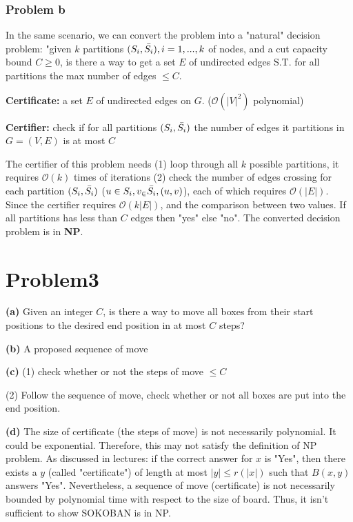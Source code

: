 \documentclass[openany]{article}
\begin{document}
\subsubsection*{Problem b}
In the same scenario, we can convert the problem into a "natural" decision problem: "given $k$ partitions $(S_i, \Bar{S_i}), i = 1, . . . , k$ of nodes, and a cut capacity bound $C \geqslant 0$, is there a way to get a set $E$ of undirected edges S.T. for all partitions the max number of edges $\leqslant C$.

\textbf{Certificate:} a set $E$ of undirected edges on $G$. ($\mathcal{O}(|V|^2)$ polynomial)

\textbf{Certifier:} check if for all partitions $(S_i,\Bar{S_i})$ the number of edges it partitions in $G=(V,E)$ is at most $C$

The certifier of this problem needs (1) loop through all $k$ possible partitions, it requires $\mathcal{O}(k)$ times of iterations (2) check the number of edges crossing for each partition $(S_i, \Bar{S_i})$ ($u \in S_i, v_\in \Bar{S_i}, (u,v)$), each of which requires $\mathcal{O}(|E|)$. Since the certifier requires $\mathcal{O}(k|E|)$, and the comparison between two values. If all partitions has less than $C$ edges then "yes" else "no". The converted decision problem is in \textbf{NP}.

\section*{Problem3}

\textbf{(a)}
Given an integer $C$, is there a way to move all boxes from their start positions to the desired end position in at most $C$ steps?

\textbf{(b)}
A proposed sequence of move

\textbf{(c)}
(1) check whether or not the steps of move $\leqslant C$

(2)  Follow the sequence of move, check whether or not all boxes are put into the end position.

\textbf{(d)}
The size of certificate (the steps of move) is not necessarily polynomial. It could be exponential. Therefore, this may not satisfy the definition of NP problem. As discussed in lectures: if the correct answer for $x$ is "Yes", then there exists a $y$ (called "certificate") of length at most $|y| \leqslant r(|x|)$ such that $B(x,y)$ answers "Yes". Nevertheless, a sequence of move (certificate) is not necessarily bounded by polynomial time with respect to the size of board. Thus, it isn't sufficient to show SOKOBAN is in NP.
\end{document}
